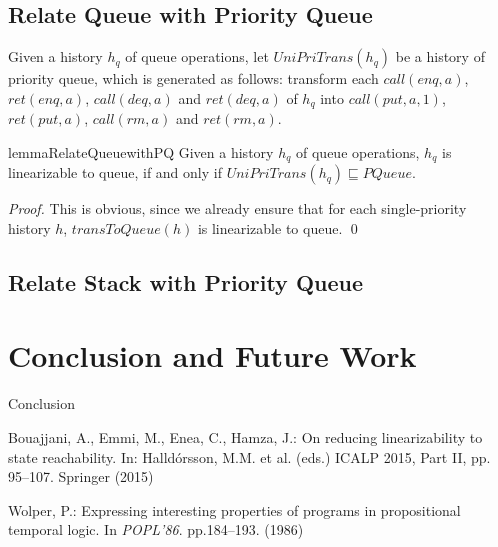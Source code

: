 \documentclass{llncs}
\begin{document}
\subsection{Relate Queue with Priority Queue}
\label{subsec:relate queue with priority queue}

Given a history $h_q$ of queue operations, let $\textit{UniPriTrans}(h_q)$ be a history of priority queue, which is generated as follows: transform each $\textit{call}(\textit{enq},a)$, $\textit{ret}(\textit{enq},a)$, $\textit{call}(\textit{deq},a)$ and $\textit{ret}(\textit{deq},a)$ of $h_q$ into $\textit{call}(\textit{put},a,1)$, $\textit{ret}(\textit{put},a)$, $\textit{call}(\textit{rm},a)$ and $\textit{ret}(\textit{rm},a)$.

\begin{restatable}{lemma}{RelateQueuewithPQ}
\label{lemma:relate queue with priority queue}
Given a history $h_q$ of queue operations, $h_q$ is linearizable to queue, if and only if $\textit{UniPriTrans}(h_q) \sqsubseteq \textit{PQueue}$.
\end{restatable}

\begin {proof}

This is obvious, since we already ensure that for each single-priority history $h$, $\textit{transToQueue}(h)$ is linearizable to queue. \qed
\end {proof}



\subsection{Relate Stack with Priority Queue}
\label{subsec:relate stack with priority queue}







\section{Conclusion and Future Work}
\label{sec:conclusion and future work}

Conclusion



%
%
%
%


\begin{thebibliography}{50}

Bouajjani, A., Emmi, M., Enea, C., Hamza, J.:
\newblock On reducing linearizability to state reachability.
\newblock In: Halld{\'{o}}rsson, M.M. et al. (eds.) ICALP 2015, Part II, pp. 95--107. Springer (2015)


Wolper, P.:
\newblock Expressing interesting properties of programs in propositional
  temporal logic.
\newblock In {\em POPL'86}. pp.184--193. (1986)


\end{thebibliography}
\newpage

\appendix
\end{document}
